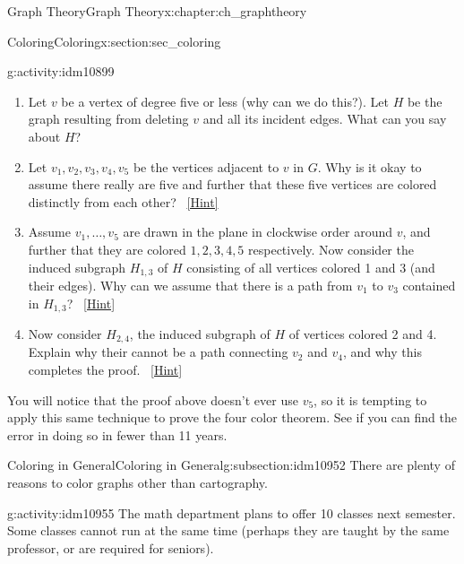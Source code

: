 \documentclass[oneside,10pt,]{book}
\numberwithin{equation}{chapter}
\begin{document}
\begin{chapterptx}{Graph Theory}{}{Graph Theory}{}{}{x:chapter:ch_graphtheory}
\begin{sectionptx}{Coloring}{}{Coloring}{}{}{x:section:sec_coloring}
\begin{introduction}{}
\begin{activity}{}{g:activity:idm10899}
\begin{enumerate}[font=\bfseries,label=(\alph*),ref=\alph*]
\item{}Let \(v\) be a vertex of degree five or less (why can we do this?).  Let \(H\) be the graph resulting from deleting \(v\) and all its incident edges.  What can you say about \(H\)?%
\item{}Let \(v_1, v_2, v_3, v_4, v_5\) be the vertices adjacent to \(v\) in \(G\).  Why is it okay to assume there really are five and further that these five vertices are colored distinctly from each other?%
\qquad~\hfill{\tiny\hyperlink{g:hint:idm10918-back}{[Hint]}}\item{}Assume \(v_1, \ldots, v_5\) are drawn in the plane in clockwise order around \(v\), and further that they are colored \(1,2,3,4,5\) respectively.  Now consider the induced subgraph \(H_{1,3}\) of \(H\) consisting of all vertices colored 1 and 3 (and their edges).  Why can we assume that there is a path from \(v_1\) to \(v_3\) contained in \(H_{1,3}\)?%
\qquad~\hfill{\tiny\hyperlink{g:hint:idm10932-back}{[Hint]}}\item{}Now consider \(H_{2,4}\), the induced subgraph of \(H\) of vertices colored 2 and 4.  Explain why their cannot be a path connecting \(v_2\) and \(v_4\), and why this completes the proof.%
\qquad~\hfill{\tiny\hyperlink{g:hint:idm10944-back}{[Hint]}}\end{enumerate}
\end{activity}
You will notice that the proof above doesn't ever use \(v_5\), so it is tempting to apply this same technique to prove the four color theorem.  See if you can find the error in doing so in fewer than 11 years.%
\end{introduction}%
%
%
\typeout{************************************************}
\typeout{************************************************}
%
\begin{subsectionptx}{Coloring in General}{}{Coloring in General}{}{}{g:subsection:idm10952}
There are plenty of reasons to color graphs other than cartography.%
\begin{activity}{}{g:activity:idm10955}%
The math department plans to offer 10 classes next semester. Some classes cannot run at the same time (perhaps they are taught by the same professor, or are required for seniors).%
\begin{sidebyside}{1}{0}{0}{0}%
\begin{sbspanel}{1}%
{\centering%
\begin{tabular}{cAl}

\end{tabular}}
\end{sbspanel}
\end{sidebyside}
\end{activity}
\end{subsectionptx}
\end{sectionptx}
\end{chapterptx}
\end{document}
